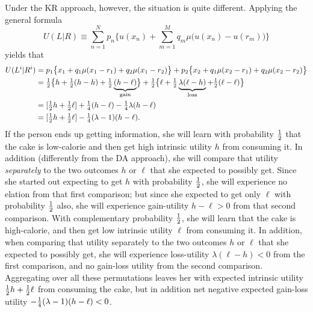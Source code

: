 Under the KR approach, however, the situation is quite different. Applying the
general formula
\begin{equation*}
  U(L|R) \equiv \sum_{n=1}^N p_n\biggl\{u(x_n) + \sum_{m=1}^M q_m
\mu\bigl(u(x_n) - u(r_m)\bigr)\biggr\}
\end{equation*}
yields that
\begin{align*}
  U(L^i|R^i)
&= p_1\bigl\{x_1 + q_1\mu(x_1 - r_1) + q_2\mu(x_1 - r_2)\bigr\}
 + p_2\bigl\{x_2 + q_1\mu(x_2 - r_1) + q_2\mu(x_2 - r_2)\bigr\}\\
&= \tfrac{1}{2}\bigl\{h + \tfrac{1}{2}(h - h) + \tfrac{1}{2}\underbrace{(h - \ell)}_{\text{gain}}\bigr\}
 + \tfrac{1}{2}\bigl\{\ell + \tfrac{1}{2}\underbrace{\lambda(\ell - h)}_{\text{loss}} + \tfrac{1}{2}(\ell - \ell)\bigr\}\\
&= [\tfrac{1}{2} h + \tfrac{1}{2} \ell] +
    \tfrac{1}{4} (h-\ell) - \tfrac{1}{4} \lambda(h-\ell)\\
&= [\tfrac{1}{2} h + \tfrac{1}{2} \ell] - \tfrac{1}{4}(\lambda-1)(h - \ell).
\end{align*}
If the person ends up getting information, she will learn with
probability $\tfrac{1}{2}$ that the cake is low-calorie and then get high intrinsic
utility $h$ from consuming it. In addition (differently from the DA approach), she will compare that utility {\em separately} to the two outcomes $h$ or $\ell$ that she expected to possibly get. Since she started out expecting to get $h$ with probability $\tfrac{1}{2}$, she will experience no elation from that first
comparison; but since she expected to get only $\ell$ with probability $\tfrac{1}{2}$
also, she will experience gain-utility $h-\ell>0$ from that second comparison. With complementary probability $\tfrac{1}{2}$, she will learn that the cake is high-calorie, and then get low intrinsic utility $\ell$ from consuming it. In addition, when comparing that utility separately to the
two outcomes $h$ or $\ell$ that she expected to possibly get, she will experience loss-utility $\lambda(\ell - h) < 0$ from the first comparison, and no gain-loss utility from the second comparison. Aggregating over all these
permutations leaves her with expected intrinsic utility $\tfrac{1}{2} h + \tfrac{1}{2} \ell$
from consuming the cake, but in addition net negative expected gain-loss
utility $-\tfrac{1}{4}(\lambda - 1)(h - \ell) < 0$.


